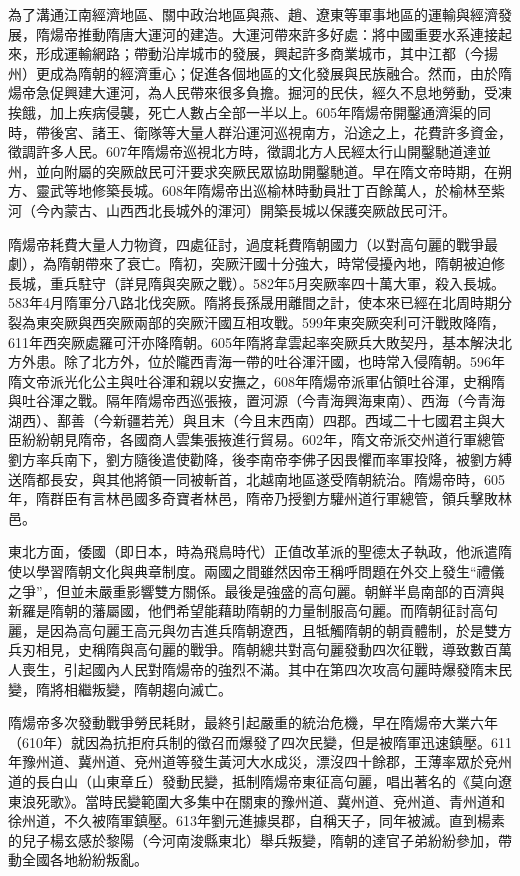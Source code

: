 為了溝通江南經濟地區、關中政治地區與燕、趙、遼東等軍事地區的運輸與經濟發展，隋煬帝推動隋唐大運河的建造。大運河帶來許多好處：將中國重要水系連接起來，形成運輸網路；帶動沿岸城市的發展，興起許多商業城市，其中江都（今揚州）更成為隋朝的經濟重心；促進各個地區的文化發展與民族融合。然而，由於隋煬帝急促興建大運河，為人民帶來很多負擔。掘河的民伕，經久不息地勞動，受凍挨餓，加上疾病侵襲，死亡人數占全部一半以上。605年隋煬帝開鑿通濟渠的同時，帶後宮、諸王、衛隊等大量人群沿運河巡視南方，沿途之上，花費許多資金，徵調許多人民。607年隋煬帝巡視北方時，徵調北方人民經太行山開鑿馳道達並州，並向附屬的突厥啟民可汗要求突厥民眾協助開鑿馳道。早在隋文帝時期，在朔方、靈武等地修築長城。608年隋煬帝出巡榆林時動員壯丁百餘萬人，於榆林至紫河（今內蒙古、山西西北長城外的渾河）開築長城以保護突厥啟民可汗。

隋煬帝耗費大量人力物資，四處征討，過度耗費隋朝國力（以對高句麗的戰爭最劇），為隋朝帶來了衰亡。隋初，突厥汗國十分強大，時常侵擾內地，隋朝被迫修長城，重兵駐守（詳見隋與突厥之戰）。582年5月突厥率四十萬大軍，殺入長城。583年4月隋軍分八路北伐突厥。隋將長孫晟用離間之計，使本來已經在北周時期分裂為東突厥與西突厥兩部的突厥汗國互相攻戰。599年東突厥突利可汗戰敗降隋，611年西突厥處羅可汗亦降隋朝。605年隋將韋雲起率突厥兵大敗契丹，基本解決北方外患。除了北方外，位於隴西青海一帶的吐谷渾汗國，也時常入侵隋朝。596年隋文帝派光化公主與吐谷渾和親以安撫之，608年隋煬帝派軍佔領吐谷渾，史稱隋與吐谷渾之戰。隔年隋煬帝西巡張掖，置河源（今青海興海東南）、西海（今青海湖西）、鄯善（今新疆若羌）與且末（今且末西南）四郡。西域二十七國君主與大臣紛紛朝見隋帝，各國商人雲集張掖進行貿易。602年，隋文帝派交州道行軍總管劉方率兵南下，劉方隨後遣使勸降，後李南帝李佛子因畏懼而率軍投降，被劉方縛送隋都長安，與其他將領一同被斬首，北越南地區遂受隋朝統治。隋煬帝時，605年，隋群臣有言林邑國多奇寶者林邑，隋帝乃授劉方驩州道行軍總管，領兵擊敗林邑。

東北方面，倭國（即日本，時為飛鳥時代）正值改革派的聖德太子執政，他派遣隋使以學習隋朝文化與典章制度。兩國之間雖然因帝王稱呼問題在外交上發生“禮儀之爭”，但並未嚴重影響雙方關係。最後是強盛的高句麗。朝鮮半島南部的百濟與新羅是隋朝的藩屬國，他們希望能藉助隋朝的力量制服高句麗。而隋朝征討高句麗，是因為高句麗王高元與勿吉進兵隋朝遼西，且牴觸隋朝的朝貢體制，於是雙方兵刃相見，史稱隋與高句麗的戰爭。隋朝總共對高句麗發動四次征戰，導致數百萬人喪生，引起國內人民對隋煬帝的強烈不滿。其中在第四次攻高句麗時爆發隋末民變，隋將相繼叛變，隋朝趨向滅亡。

隋煬帝多次發動戰爭勞民耗財，最終引起嚴重的統治危機，早在隋煬帝大業六年（610年）就因為抗拒府兵制的徵召而爆發了四次民變，但是被隋軍迅速鎮壓。611年豫州道、冀州道、兗州道等發生黃河大水成災，漂沒四十餘郡，王薄率眾於兗州道的長白山（山東章丘）發動民變，抵制隋煬帝東征高句麗，唱出著名的《莫向遼東浪死歌》。當時民變範圍大多集中在關東的豫州道、冀州道、兗州道、青州道和徐州道，不久被隋軍鎮壓。613年劉元進據吳郡，自稱天子，同年被滅。直到楊素的兒子楊玄感於黎陽（今河南浚縣東北）舉兵叛變，隋朝的達官子弟紛紛參加，帶動全國各地紛紛叛亂。

